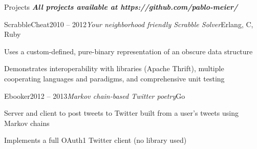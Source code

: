 \documentclass{resume} %
\begin{document}
\begin{rSection}{Projects}
\noindent{}\textbf{\textit{All projects available at https://github.com/pablo-meier/}}

\begin{rSubsection}{ScrabbleCheat}{2010 -- 2012}{\textit{Your neighborhood friendly Scrabble Solver}}{Erlang, C, Ruby}
\item Uses a custom-defined, pure-binary representation of an obscure data structure
\item Demonstrates interoperability with libraries (Apache Thrift), multiple cooperating languages and paradigms, and comprehensive unit testing
\end{rSubsection}

\begin{rSubsection}{Ebooker}{2012 -- 2013}{\textit{Markov chain-based Twitter poetry}}{Go}
\item Server and client to post tweets to Twitter built from a user's tweets using Markov chains
\item Implements a full OAuth1 Twitter client (no library used)
\end{rSubsection}
\end{rSection}

\end{document}
